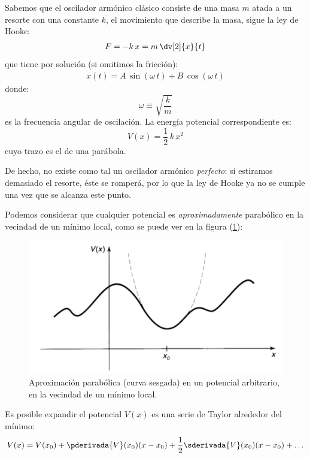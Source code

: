 Sabemos que el oscilador armónico clásico consiste de una masa $m$ atada a un resorte con una constante $k$, el movimiento que describe la masa, sigue la ley de Hooke:
\begin{align*}
F = - k \, x = m \, \dv[2]{x}{t}
\end{align*}
que tiene por solución (si omitimos la fricción):
\begin{align*}
x(t) = A \, \sin (\omega \, t) + B \, \cos (\omega \, t)
\end{align*}
donde:
\begin{equation}
\omega \equiv \sqrt{\dfrac{k}{m}}
\label{eq:ecuacion_02_041}
\end{equation}
es la frecuencia angular de oscilación. La energía potencial correspondiente es:
\begin{equation}
V(x) = \dfrac{1}{2} \, k \, x^{2}
\label{eq:ecuacion_02_042}
\end{equation}
cuyo trazo es el de una parábola.
\par
De hecho, no existe como tal un oscilador armónico \emph{perfecto}: si estiramos demasiado el resorte, éste se romperá, por lo que la ley de Hooke ya no se cumple una vez que se alcanza este punto.
\par
Podemos considerar que cualquier potencial es \textit{aproximadamente} parabólico en la vecindad de un mínimo local, como se puede ver en la figura (\ref{fig:figura_02_04}):
\begin{figure}[H]
    \centering
    \includegraphics[scale=0.5]{Imagenes/Potencial_arbitrario.png}
    \caption{Aproximación parabólica (curva sesgada) en un potencial arbitrario, en la vecindad de un mínimo local.}
    \label{fig:figura_02_04}
\end{figure}
Es posible expandir el potencial $V(x)$ es una serie de Taylor alrededor del mínimo:
\begin{align*}
V(x) = V(x_{0}) + \pderivada{V} (x_{0}) (x - x_{0}) + \dfrac{1}{2} \sderivada{V} (x_{0}) (x - x_{0}) + \ldots
\end{align*}
